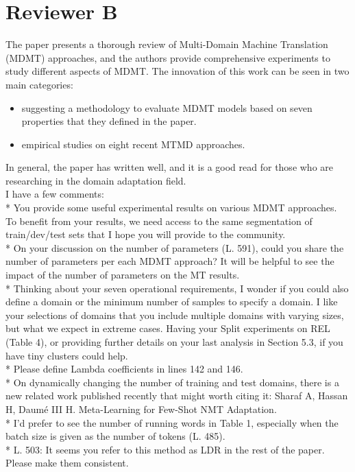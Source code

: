 \documentclass[12pt,times,a4paper,twoside]{article}
\theoremstyle{definition}
\begin{document}
\section*{Reviewer B}
The paper presents a thorough review of Multi-Domain Machine Translation (MDMT) approaches, and the authors provide comprehensive experiments to study different aspects of MDMT. The innovation of this work can be seen in two main categories:
\begin{itemize}
	\item suggesting a methodology to evaluate MDMT models based on seven properties that they defined in the paper.
	\item empirical studies on eight recent MTMD approaches.
\end{itemize}
In general, the paper has written well, and it is a good read for those who are researching in the domain adaptation field. 
\\
I have a few comments:
\\
* You provide some useful experimental results on various MDMT approaches. To benefit from your results, we need access to the same segmentation of train/dev/test sets that I hope you will provide to the community.
\\
* On your discussion on the number of parameters (L. 591), could you share the number of parameters per each MDMT approach? It will be helpful to see  the impact of the number of parameters on the MT results. 
\\
* Thinking about your seven operational requirements, I wonder if you could also define a domain or the minimum number of samples to specify a domain. I like your selections of domains that you include multiple domains with varying sizes, but what we expect in extreme cases. Having your Split experiments on REL (Table 4), or providing further details on your last analysis in Section 5.3, if you have tiny clusters could help.
\\
* Please define Lambda coefficients in lines 142 and 146.
\\
* On dynamically changing the number of training and test domains, there is a new related work published recently that might worth citing it: Sharaf A, Hassan H, Daumé III H. Meta-Learning for Few-Shot NMT Adaptation.
\\
* I’d prefer to see the number of running words in Table 1, especially when the batch size is given as the number of tokens (L. 485).
\\
* L. 503: It seems you refer to this method as LDR in the rest of the paper. Please make them consistent.
\end{document}
